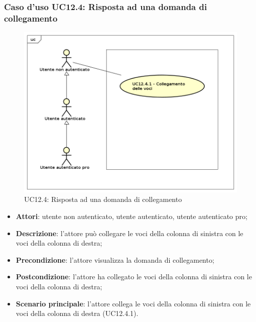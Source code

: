 \subsubsection{Caso d'uso UC12.4: Risposta ad una domanda di collegamento}
\begin{figure}[h]
	\centering
	\includegraphics[scale=0.5]{UML/UC12_4.png}
	\caption{UC12.4: Risposta ad una domanda di collegamento}
\end{figure}
\begin{itemize}
\item \textbf{Attori}: utente non autenticato, utente autenticato, utente autenticato pro;
\item \textbf{Descrizione}: l'attore può collegare le voci della colonna di sinistra con le voci della colonna di destra;
\item \textbf{Precondizione}: l'attore visualizza la domanda di collegamento;
\item \textbf{Postcondizione}: l'attore ha collegato le voci della colonna di sinistra con le voci della colonna di destra;
\item \textbf{Scenario principale}: l'attore collega le voci della colonna di sinistra con le voci della colonna di destra (UC12.4.1).
\end{itemize}

\newpage
